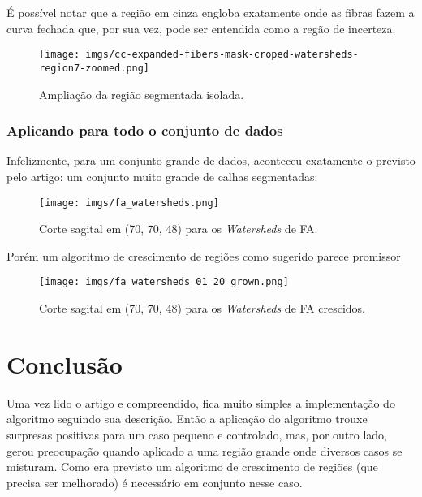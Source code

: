 \documentclass[a4paper,11pt]{report}
\begin{document}
    É possível notar que a região em cinza engloba exatamente onde as fibras fazem a curva fechada que, por sua vez, pode ser entendida como a regão de incerteza.

    \begin{figure}[H]
      \centering
      \texttt{[image: imgs/cc-expanded-fibers-mask-croped-watersheds-region7-zoomed.png]}
      \caption{Ampliação da região segmentada isolada.}
      \label{fig:fibres-mask-croped-segmented-region}
    \end{figure}

  \subsection{Aplicando para todo o conjunto de dados}
  Infelizmente, para um conjunto grande de dados, aconteceu exatamente o previsto pelo artigo: um conjunto muito grande de calhas segmentadas:

  \begin{figure}[H]
    \texttt{[image: imgs/fa\_watersheds.png]}
    \caption{Corte sagital em (70, 70, 48) para os \textit{Watersheds} de FA.}
    \label{fig:fa_watersheds}
  \end{figure}

  Porém um algoritmo de crescimento de regiões como sugerido parece promissor

  \begin{figure}[H]
    \texttt{[image: imgs/fa\_watersheds\_01\_20\_grown.png]}
    \caption{Corte sagital em (70, 70, 48) para os \textit{Watersheds} de FA crescidos.}
    \label{fig:fa_watersheds_grown}
  \end{figure}

\chapter{Conclusão}
Uma vez lido o artigo e compreendido, fica muito simples a implementação do algoritmo seguindo sua descrição. Então a aplicação do algoritmo trouxe surpresas positivas para um caso pequeno e controlado, mas, por outro lado, gerou preocupação quando aplicado a uma região grande onde diversos casos se misturam. Como era previsto um algoritmo de crescimento de regiões (que precisa ser melhorado) é necessário em conjunto nesse caso.
\end{document}
